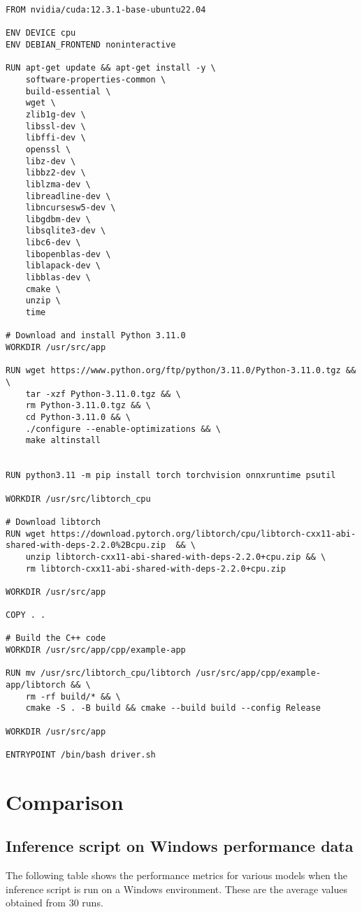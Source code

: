 \documentclass{article}
\begin{document}
\begin{verbatim}
FROM nvidia/cuda:12.3.1-base-ubuntu22.04

ENV DEVICE cpu
ENV DEBIAN_FRONTEND noninteractive

RUN apt-get update && apt-get install -y \
    software-properties-common \
    build-essential \
    wget \
    zlib1g-dev \
    libssl-dev \
    libffi-dev \
    openssl \
    libz-dev \
    libbz2-dev \
    liblzma-dev \
    libreadline-dev \
    libncursesw5-dev \
    libgdbm-dev \
    libsqlite3-dev \
    libc6-dev \
    libopenblas-dev \
    liblapack-dev \
    libblas-dev \
    cmake \
    unzip \
    time

# Download and install Python 3.11.0
WORKDIR /usr/src/app

RUN wget https://www.python.org/ftp/python/3.11.0/Python-3.11.0.tgz && \
    tar -xzf Python-3.11.0.tgz && \
    rm Python-3.11.0.tgz && \
    cd Python-3.11.0 && \
    ./configure --enable-optimizations && \
    make altinstall


RUN python3.11 -m pip install torch torchvision onnxruntime psutil

WORKDIR /usr/src/libtorch_cpu

# Download libtorch
RUN wget https://download.pytorch.org/libtorch/cpu/libtorch-cxx11-abi-shared-with-deps-2.2.0%2Bcpu.zip  && \
    unzip libtorch-cxx11-abi-shared-with-deps-2.2.0+cpu.zip && \
    rm libtorch-cxx11-abi-shared-with-deps-2.2.0+cpu.zip

WORKDIR /usr/src/app

COPY . .

# Build the C++ code
WORKDIR /usr/src/app/cpp/example-app

RUN mv /usr/src/libtorch_cpu/libtorch /usr/src/app/cpp/example-app/libtorch && \
    rm -rf build/* && \
    cmake -S . -B build && cmake --build build --config Release

WORKDIR /usr/src/app

ENTRYPOINT /bin/bash driver.sh

\end{verbatim}

\newpage
\section{Comparison}
\subsection{Inference script on Windows performance data}
The following table shows the performance metrics for various models when the inference script is run on a Windows environment. These are the average values obtained from 30 runs.
\end{document}

